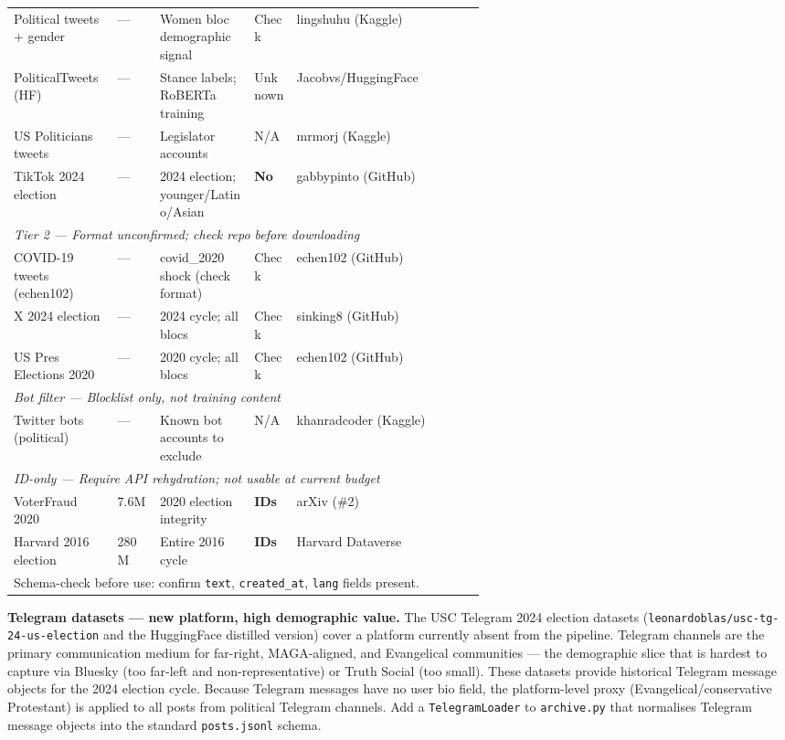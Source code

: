 \documentclass[11pt]{article}
\begin{document}
\begin{center}
{\begin{tabularx}{\linewidth}{p{0.22\linewidth}p{0.09\linewidth}p{0.20\linewidth}p{0.09\linewidth}X}
Political tweets + gender & --- & Women bloc demographic signal & Check & lingshuhu (Kaggle) \\
PoliticalTweets (HF) & --- & Stance labels; RoBERTa training & Unknown & Jacobvs/HuggingFace \\
US Politicians tweets & --- & Legislator accounts & N/A & mrmorj (Kaggle) \\
TikTok 2024 election & --- & 2024 election; younger/Latino/Asian & \textbf{No} & gabbypinto (GitHub) \\[4pt]
\multicolumn{5}{l}{\small\textit{Tier 2 --- Format unconfirmed; check repo before downloading}} \\[2pt]
COVID-19 tweets (echen102) & --- & covid\_2020 shock (check format) & Check & echen102 (GitHub) \\
X 2024 election & --- & 2024 cycle; all blocs & Check & sinking8 (GitHub) \\
US Pres Elections 2020 & --- & 2020 cycle; all blocs & Check & echen102 (GitHub) \\[4pt]
\multicolumn{5}{l}{\small\textit{Bot filter --- Blocklist only, not training content}} \\[2pt]
Twitter bots (political) & --- & Known bot accounts to exclude & N/A & khanradcoder (Kaggle) \\[4pt]
\multicolumn{5}{l}{\small\textit{ID-only --- Require API rehydration; not usable at current budget}} \\[2pt]
VoterFraud 2020 & 7.6M & 2020 election integrity & \textbf{IDs} & arXiv (\#2) \\
Harvard 2016 election & 280M & Entire 2016 cycle & \textbf{IDs} & Harvard Dataverse \\
\bottomrule
\multicolumn{5}{l}{\scriptsize Schema-check before use: confirm \texttt{text}, \texttt{created\_at}, \texttt{lang} fields present.} \\
\end{tabularx}}
\end{center}

\medskip
\noindent\textbf{Telegram datasets --- new platform, high demographic value.}
The USC Telegram 2024 election datasets (\texttt{leonardoblas/usc-tg-24-us-election}
and the HuggingFace distilled version) cover a platform currently absent from the
pipeline. Telegram channels are the primary communication medium for far-right,
MAGA-aligned, and Evangelical communities --- the demographic slice that is
hardest to capture via Bluesky (too far-left and non-representative) or Truth Social (too small).
These datasets provide historical Telegram message objects for the 2024 election
cycle. Because Telegram messages have no user bio field, the platform-level proxy
(Evangelical/conservative Protestant) is applied to all posts from political
Telegram channels. Add a \texttt{TelegramLoader} to \texttt{archive.py} that
normalises Telegram message objects into the standard \texttt{posts.jsonl} schema.
\end{document}
